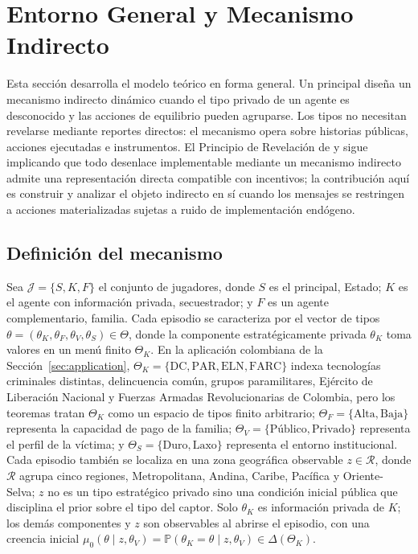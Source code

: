 \documentclass[pdflatex,sn-mathphys-ay]{sn-jnl}
\theoremstyle{thmstyleone}
\theoremstyle{thmstyletwo}
\theoremstyle{thmstylethree}
\newcommand{\Prob}{\mathbb{P}}
\newcommand{\ThetaK}{\Theta_K}
\newcommand{\1}{\mathbf{1}}
\begin{document}
\section{Entorno General y Mecanismo Indirecto}\label{sec:model}

Esta sección desarrolla el modelo teórico en forma general. Un principal diseña un mecanismo indirecto dinámico cuando el tipo privado de un agente es desconocido y las acciones de equilibrio pueden agruparse. Los tipos no necesitan revelarse mediante reportes directos: el mecanismo opera sobre historias públicas, acciones ejecutadas e instrumentos. El Principio de Revelación de \citet{Gibbard1973} y \citet{Myerson1979IC,Myerson1981} sigue implicando que todo desenlace implementable mediante un mecanismo indirecto admite una representación directa compatible con incentivos; la contribución aquí es construir y analizar el objeto indirecto en sí cuando los mensajes se restringen a acciones materializadas sujetas a ruido de implementación endógeno.

\subsection{Definición del mecanismo}\label{subsec:def-mecanismo}


Sea $\mathcal{J}=\{S,K,F\}$ el conjunto de jugadores, donde $S$ es el principal, Estado; $K$ es el agente con información privada, secuestrador; y $F$ es un agente complementario, familia. Cada episodio se caracteriza por el vector de tipos $\theta=(\theta_K,\theta_F,\theta_V,\theta_S)\in\Theta$, donde la componente estratégicamente privada $\theta_K$ toma valores en un menú finito $\ThetaK$. En la aplicación colombiana de la Sección~\ref{sec:application}, $\ThetaK=\{\text{DC},\text{PAR},\text{ELN},\text{FARC}\}$ indexa tecnologías criminales distintas, delincuencia común, grupos paramilitares, Ejército de Liberación Nacional y Fuerzas Armadas Revolucionarias de Colombia, pero los teoremas tratan $\ThetaK$ como un espacio de tipos finito arbitrario; $\Theta_F=\{\text{Alta},\text{Baja}\}$ representa la capacidad de pago de la familia; $\Theta_V=\{\text{Público},\text{Privado}\}$ representa el perfil de la víctima; y $\Theta_S=\{\text{Duro},\text{Laxo}\}$ representa el entorno institucional. Cada episodio también se localiza en una zona geográfica observable $z\in\mathcal{R}$, donde $\mathcal{R}$ agrupa cinco regiones, Metropolitana, Andina, Caribe, Pacífica y Oriente-Selva; $z$ no es un tipo estratégico privado sino una condición inicial pública que disciplina el prior sobre el tipo del captor. Solo $\theta_K$ es información privada de $K$; los demás componentes y $z$ son observables al abrirse el episodio, con una creencia inicial $\mu_0(\theta\mid z,\theta_V)=\Prob(\theta_K=\theta\mid z,\theta_V)\in\Delta(\ThetaK)$.
\end{document}
